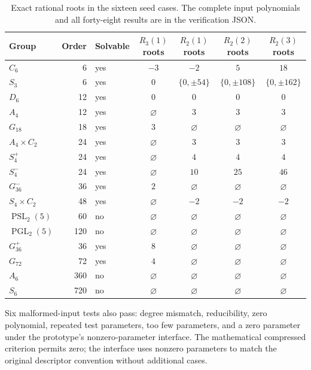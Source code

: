 \documentclass[11pt,letterpaper]{article}
\numberwithin{equation}{section}
\theoremstyle{definition}
\theoremstyle{remark}
\begin{document}
\begin{table}[htbp]
\centering\small
\begin{tabular}{@{}lrlcccc@{}}
\toprule
Group & Order & Solvable & $R_3(1)$ roots & $R_2(1)$ roots & $R_2(2)$ roots & $R_2(3)$ roots\\
\midrule
$C_6$ &6& yes&$-3$&$-2$&$5$&$18$\\
$S_3$ &6& yes&$0$&$\{0,\pm54\}$&$\{0,\pm108\}$&$\{0,\pm162\}$\\
$D_6$ &12& yes&$0$&$0$&$0$&$0$\\
$A_4$ &12& yes&$\varnothing$&$3$&$3$&$3$\\
$G_{18}$ &18& yes&$3$&$\varnothing$&$\varnothing$&$\varnothing$\\
$A_4\!\times\! C_2$ &24& yes&$\varnothing$&$3$&$3$&$3$\\
$S_4^+$ &24& yes&$\varnothing$&$4$&$4$&$4$\\
$S_4^-$ &24& yes&$\varnothing$&$10$&$25$&$46$\\
$G_{36}^-$ &36& yes&$2$&$\varnothing$&$\varnothing$&$\varnothing$\\
$S_4\!\times\! C_2$ &48& yes&$\varnothing$&$-2$&$-2$&$-2$\\
$\operatorname{PSL}_2(5)$ &60& no&$\varnothing$&$\varnothing$&$\varnothing$&$\varnothing$\\
$\operatorname{PGL}_2(5)$ &120& no&$\varnothing$&$\varnothing$&$\varnothing$&$\varnothing$\\
$G_{36}^+$ &36& yes&$8$&$\varnothing$&$\varnothing$&$\varnothing$\\
$G_{72}$ &72& yes&$4$&$\varnothing$&$\varnothing$&$\varnothing$\\
$A_6$ &360& no&$\varnothing$&$\varnothing$&$\varnothing$&$\varnothing$\\
$S_6$ &720& no&$\varnothing$&$\varnothing$&$\varnothing$&$\varnothing$\\
\bottomrule
\end{tabular}
\caption{Exact rational roots in the sixteen seed cases. The complete input
polynomials and all forty-eight results are in the verification JSON.}
\label{tpo:tab:groups}
\end{table}

Six malformed-input tests also pass: degree mismatch, reducibility, zero
polynomial, repeated test parameters, too few parameters, and a zero parameter
under the prototype's nonzero-parameter interface. The mathematical compressed
criterion permits zero; the interface uses nonzero parameters to match the
original descriptor convention without additional cases.
\end{document}

